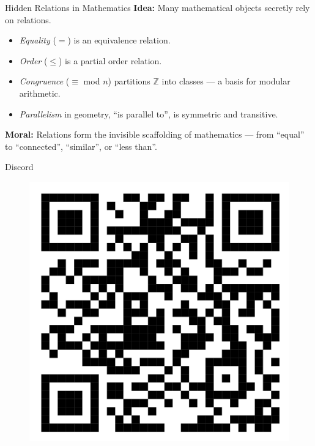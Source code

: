 \documentclass[11pt]{beamer}
\theoremstyle{plain}
\begin{document}
\begin{frame}{Hidden Relations in Mathematics}
\textbf{Idea:}  
Many mathematical objects secretly rely on relations.

\begin{itemize}
    \item \emph{Equality} ($=$) is an equivalence relation.  
    \item \emph{Order} ($\leq$) is a partial order relation.  
    \item \emph{Congruence} ($\equiv$ mod $n$) partitions $\mathbb{Z}$ into classes — a basis for modular arithmetic.  
    \item \emph{Parallelism} in geometry, “is parallel to”, is symmetric and transitive.
\end{itemize}

\medskip
\textbf{Moral:}  
Relations form the invisible scaffolding of mathematics —  
from “equal” to “connected”, “similar”, or “less than”.
\end{frame}

\begin{frame}{Discord}
    \begin{figure}
        \centering
        \includegraphics[width=0.5\linewidth]{qr_code.png}
    \end{figure}
\end{frame}
\end{document}
